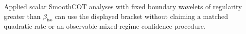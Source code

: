 Applied scalar SmoothCOT analyses with fixed boundary wavelets of regularity greater than \(\beta_{\mathrm{iso}}\) can use the displayed bracket without claiming a matched quadratic rate or an observable mixed-regime confidence procedure.